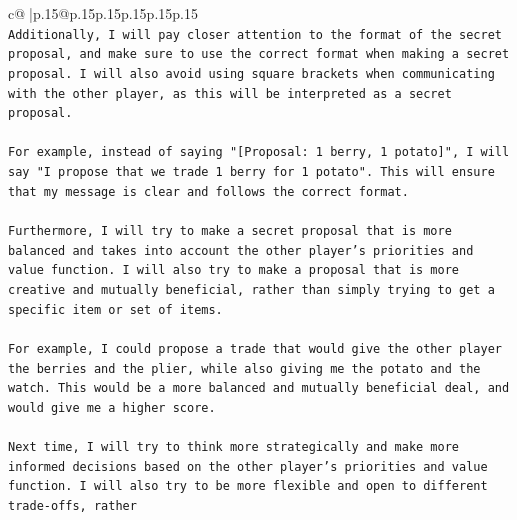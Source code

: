 \documentclass{article}
\begin{document}
{\begin{supertabular}{c@{$\;$}|p{.15\linewidth}@{}p{.15\linewidth}p{.15\linewidth}p{.15\linewidth}p{.15\linewidth}p{.15\linewidth}}
{{{\\ 
\texttt{Additionally, I will pay closer attention to the format of the secret proposal, and make sure to use the correct format when making a secret proposal. I will also avoid using square brackets when communicating with the other player, as this will be interpreted as a secret proposal. } \\
\\ 
\texttt{For example, instead of saying "{[}Proposal: 1 berry, 1 potato{]}", I will say "I propose that we trade 1 berry for 1 potato". This will ensure that my message is clear and follows the correct format.} \\
\\ 
\texttt{Furthermore, I will try to make a secret proposal that is more balanced and takes into account the other player's priorities and value function. I will also try to make a proposal that is more creative and mutually beneficial, rather than simply trying to get a specific item or set of items.} \\
\\ 
\texttt{For example, I could propose a trade that would give the other player the berries and the plier, while also giving me the potato and the watch. This would be a more balanced and mutually beneficial deal, and would give me a higher score.} \\
\\ 
\texttt{Next time, I will try to think more strategically and make more informed decisions based on the other player's priorities and value function. I will also try to be more flexible and open to different trade{-}offs, rather} \\
            }
        }
    }
     \\ \\

\end{supertabular}
}
\end{document}
